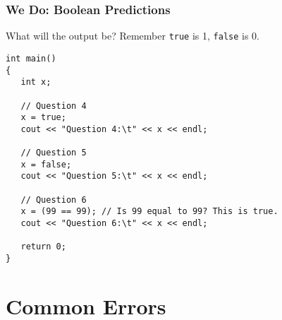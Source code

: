\documentclass{beamer}
\begin{document}
\begin{frame}[fragile]
\frametitle{We Do: Boolean Predictions}
What will the output be? Remember \texttt{true} is 1, \texttt{false} is 0.
\begin{verbatim}
int main()
{
   int x;

   // Question 4
   x = true;
   cout << "Question 4:\t" << x << endl;

   // Question 5
   x = false;
   cout << "Question 5:\t" << x << endl;

   // Question 6
   x = (99 == 99); // Is 99 equal to 99? This is true.
   cout << "Question 6:\t" << x << endl;

   return 0;
}
\end{verbatim}
\end{frame}

\section{Common Errors}
\end{document}
